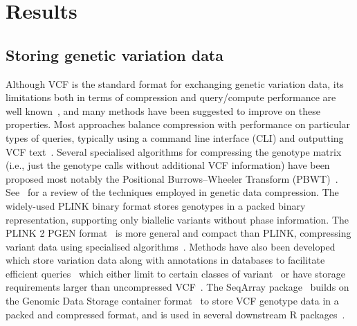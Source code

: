 \documentclass[a4paper,num-refs]{oup-contemporary}
\begin{document}
\section{Results}

\subsection{Storing genetic variation data}
Although VCF is the standard format for exchanging genetic variation
data, its limitations both in terms of compression 
and query/compute performance are well 
known~\citep[e.g.][]{kelleher2013processing,layer2016efficient,li2016bgt},
and many methods 
have been suggested to improve on these properties.
Most approaches balance compression with
performance on particular types of queries, 
typically using a command line interface (CLI)
and outputting VCF text~\citep{
layer2016efficient, %
li2016bgt, %
tatwawadi2016gtrac, %
danek2018gtc, %
lin2020sparse, %
lan2020genozip,lan2021genozip, %
lefaive2021sparse, %
wertenbroek2022xsi,%
zhang2023gbc}. %
Several specialised algorithms for compressing 
the genotype matrix (i.e., just the genotype calls without additional
VCF information) have been proposed
\citep{qiao2012handling, %
deorowicz2013genome, %
sambo2014compression, %
deorowicz2019gtshark, %
deorowicz2021vcfshark, %
dehaas2024genotype} %
most notably the Positional
Burrows--Wheeler Transform (PBWT)~\citep{durbin2014efficient}.
See~\citep{mcvean2019linkage} for a review of the techniques
employed in genetic data compression.
The widely-used PLINK binary format stores genotypes in a 
packed binary representation, supporting only biallelic
variants without phase information.
The PLINK 2 PGEN format~\citep{rivas2024efficient} is more general
and compact than PLINK, compressing variant data using specialised
algorithms~\cite{sambo2014compression}.
Methods have also been developed which store variation data 
along with annotations in databases to facilitate
efficient queries~\cite[e.g.][]{
paila2013gemini,%
lopez2017hgva} %
which either limit to certain classes of variant~\cite[e.g.][]{greene2023genetic}
or have storage requirements larger
than uncompressed VCF~\citep{al2023critical}. 
The SeqArray package~\citep{zheng2017seqarray} builds on the 
Genomic Data Storage container format~\cite{zheng2012high}
to store VCF genotype data in a packed and compressed format,
and is used in several downstream R packages~\cite[e.g.][]{
gogarten2019genetic,fernandes2020simplephenotypes}.
\end{document}
